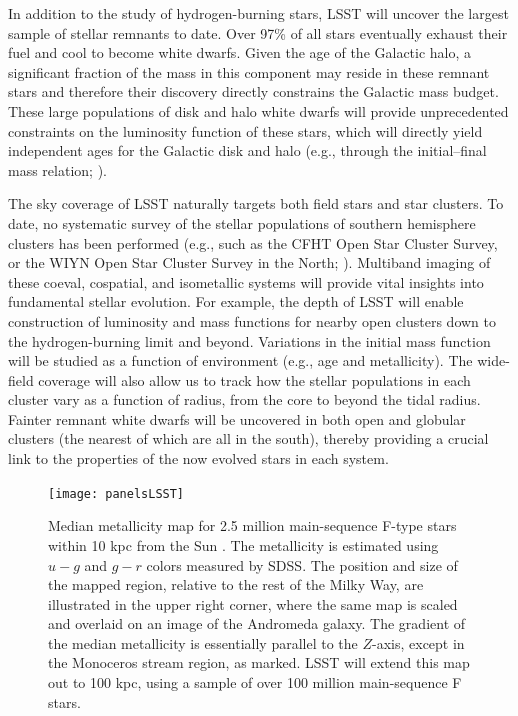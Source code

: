 In addition to the study of hydrogen-burning stars, LSST will uncover the largest sample of stellar remnants to date.
Over 97\% of all stars eventually exhaust their fuel and cool to become white dwarfs. Given the age of the Galactic
halo, a significant fraction of the mass in this component may reside in these remnant stars
\citep[e.g.,][]{2000ApJ...542..281A,2007A&A...469..387T}
and therefore their discovery directly constrains the Galactic mass budget.  These large
populations of disk and halo white dwarfs will provide unprecedented constraints on the luminosity function of
these stars, which will directly yield independent ages for the Galactic disk and halo (e.g., through the initial--final mass
relation; \citet{2008ApJ...676..594K}).

The sky coverage of LSST naturally targets both field stars and star clusters.  To date, no systematic survey of the stellar
populations of southern hemisphere clusters has been performed (e.g., such as the CFHT Open Star Cluster Survey, or
the WIYN Open Star Cluster Survey in the North; \citealt{2000ASPC..198..517M,2001AJ....122..257K}).  Multiband imaging of these coeval,
cospatial, and isometallic systems will provide vital insights into fundamental stellar evolution.  For example, the depth
of LSST will enable construction of  luminosity and mass functions for nearby open clusters down to the hydrogen-burning
limit and beyond.  Variations in the initial mass function will be studied as a function of environment (e.g., age and metallicity).
The wide-field coverage will also allow us to track how the stellar populations in each cluster vary as a function of radius,
from the core to beyond the tidal radius. Fainter remnant white dwarfs will be uncovered in both open and globular clusters
(the nearest of which are all in the south), thereby providing a crucial link to the properties of the now evolved stars in each
system.



\begin{figure}
\texttt{[image: panelsLSST]}
\caption{
Median metallicity map for 2.5 million main-sequence F-type stars within 10 kpc
from the Sun \citep[adapted from][]{2008ApJ...684..287I}. The metallicity is estimated using
$u-g$ and $g-r$ colors measured by SDSS. The position and size of the mapped
region, relative to the rest of the Milky Way, are illustrated in the upper right
corner, where the same map is scaled and overlaid on an image of the Andromeda
galaxy. The gradient of the median metallicity is essentially parallel
to the $Z$-axis, except in the Monoceros stream region, as marked. LSST
will extend this map out to 100 kpc, using a sample of over 100 million
main-sequence F stars.}
\label{Fig:FeH3}
\end{figure}


